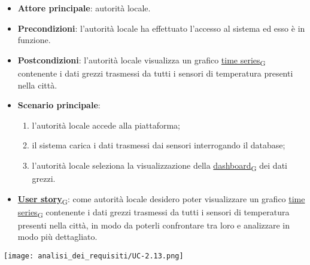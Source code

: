 \begin{itemize}
	\item \textbf{Attore principale}: autorità locale.
	\item \textbf{Precondizioni}: l'autorità locale ha effettuato l'accesso al sistema ed esso è in funzione.
	\item \textbf{Postcondizioni}: l'autorità locale visualizza un grafico \href{https://7last.github.io/docs/rtb/documentazione-interna/glossario\#time-series}{time series\textsubscript{G}} contenente i dati grezzi trasmessi da tutti i sensori
	      di temperatura presenti nella città.
	\item \textbf{Scenario principale}:
	      \begin{enumerate}
		      \item l'autorità locale accede alla piattaforma;
		      \item il sistema carica i dati trasmessi dai sensori interrogando il database;
		      \item l'autorità locale seleziona la visualizzazione della \href{https://7last.github.io/docs/rtb/documentazione-interna/glossario\#dashboard}{dashboard\textsubscript{G}} dei dati grezzi.
	      \end{enumerate}
	\item \href{https://7last.github.io/docs/rtb/documentazione-interna/glossario\#user-story}{\textbf{User story}\textsubscript{G}}:
	      come autorità locale desidero poter visualizzare un grafico \href{https://7last.github.io/docs/rtb/documentazione-interna/glossario\#time-series}{time series\textsubscript{G}} contenente i dati grezzi trasmessi da tutti i sensori
	      di temperatura presenti nella città, in modo da poterli confrontare tra loro e analizzare in modo più dettagliato.
\end{itemize}
\begin{center}
	\texttt{[image: analisi\_dei\_requisiti/UC-2.13.png]}
\end{center}

\newpage

